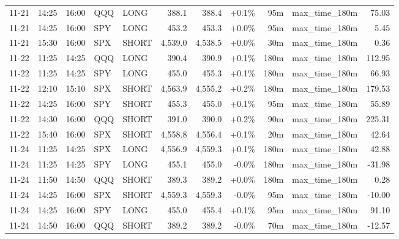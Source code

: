\documentclass[11pt,a4paper,twoside]{article}
\begin{document}
\begin{center}
\begin{longtable}{>{\color{txtmain}}l l l l l r r r r >{\color{txtmain}}l r}
11-21 & 14:25 & 16:00 & QQQ & LONG & 388.1 & 388.4 & \textcolor{wingreen}{+0.1\%} & 95m & max\_time\_180m & \textcolor{wingreen}{75.03} \\
11-21 & 14:25 & 16:00 & SPY & LONG & 453.2 & 453.3 & \textcolor{wingreen}{+0.0\%} & 95m & max\_time\_180m & \textcolor{wingreen}{5.45} \\
11-21 & 15:30 & 16:00 & SPX & SHORT & 4,539.0 & 4,538.5 & \textcolor{wingreen}{+0.0\%} & 30m & max\_time\_180m & \textcolor{wingreen}{0.36} \\
11-22 & 11:25 & 14:25 & QQQ & LONG & 390.4 & 390.9 & \textcolor{wingreen}{+0.1\%} & 180m & max\_time\_180m & \textcolor{wingreen}{112.95} \\
11-22 & 11:25 & 14:25 & SPY & LONG & 455.0 & 455.3 & \textcolor{wingreen}{+0.1\%} & 180m & max\_time\_180m & \textcolor{wingreen}{66.93} \\
11-22 & 12:10 & 15:10 & SPX & SHORT & 4,563.9 & 4,555.2 & \textcolor{wingreen}{+0.2\%} & 180m & max\_time\_180m & \textcolor{wingreen}{179.53} \\
11-22 & 14:25 & 16:00 & SPY & SHORT & 455.3 & 455.0 & \textcolor{wingreen}{+0.1\%} & 95m & max\_time\_180m & \textcolor{wingreen}{55.89} \\
11-22 & 14:30 & 16:00 & QQQ & SHORT & 391.0 & 390.0 & \textcolor{wingreen}{+0.2\%} & 90m & max\_time\_180m & \textcolor{wingreen}{225.31} \\
11-22 & 15:40 & 16:00 & SPX & SHORT & 4,558.8 & 4,556.4 & \textcolor{wingreen}{+0.1\%} & 20m & max\_time\_180m & \textcolor{wingreen}{42.64} \\
11-24 & 11:25 & 14:25 & SPX & LONG & 4,556.9 & 4,559.3 & \textcolor{wingreen}{+0.1\%} & 180m & max\_time\_180m & \textcolor{wingreen}{42.88} \\
11-24 & 11:25 & 14:25 & SPY & LONG & 455.1 & 455.0 & \textcolor{lossred}{-0.0\%} & 180m & max\_time\_180m & \textcolor{lossred}{-31.98} \\
11-24 & 11:50 & 14:50 & QQQ & SHORT & 389.3 & 389.2 & \textcolor{wingreen}{+0.0\%} & 180m & max\_time\_180m & \textcolor{wingreen}{0.28} \\
11-24 & 14:25 & 16:00 & SPX & SHORT & 4,559.3 & 4,559.3 & \textcolor{wingreen}{-0.0\%} & 95m & max\_time\_180m & \textcolor{lossred}{-10.00} \\
11-24 & 14:25 & 16:00 & SPY & LONG & 455.0 & 455.4 & \textcolor{wingreen}{+0.1\%} & 95m & max\_time\_180m & \textcolor{wingreen}{91.10} \\
11-24 & 14:50 & 16:00 & QQQ & SHORT & 389.2 & 389.2 & \textcolor{lossred}{-0.0\%} & 70m & max\_time\_180m & \textcolor{lossred}{-12.57} \\

\end{longtable}
\end{center}
\end{document}
